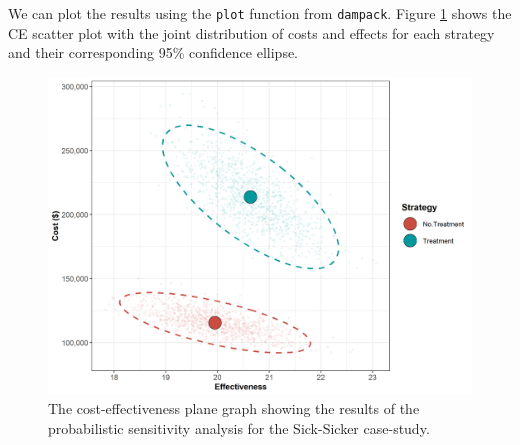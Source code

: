 \documentclass[]{book}
\newenvironment{Shaded}{\begin{snugshade}}{\end{snugshade}}
\newcommand{\KeywordTok}[1]{\textcolor[rgb]{0.13,0.29,0.53}{\textbf{#1}}}
\newcommand{\DataTypeTok}[1]{\textcolor[rgb]{0.13,0.29,0.53}{#1}}
\newcommand{\DecValTok}[1]{\textcolor[rgb]{0.00,0.00,0.81}{#1}}
\newcommand{\CharTok}[1]{\textcolor[rgb]{0.31,0.60,0.02}{#1}}
\newcommand{\StringTok}[1]{\textcolor[rgb]{0.31,0.60,0.02}{#1}}
\newcommand{\CommentTok}[1]{\textcolor[rgb]{0.56,0.35,0.01}{\textit{#1}}}
\newcommand{\ControlFlowTok}[1]{\textcolor[rgb]{0.13,0.29,0.53}{\textbf{#1}}}
\newcommand{\OperatorTok}[1]{\textcolor[rgb]{0.81,0.36,0.00}{\textbf{#1}}}
\newcommand{\NormalTok}[1]{#1}
\begin{document}
\begin{Shaded}
\end{Shaded}

We can plot the results using the \texttt{plot} function from
\texttt{dampack}. Figure \ref{fig:05a-CEAplane} shows the CE scatter
plot with the joint distribution of costs and effects for each strategy
and their corresponding 95\% confidence ellipse.

\begin{figure}

{\centering \includegraphics[width=1\linewidth]{../figs/05a_cea_plane_scatter} 

}

\caption{The cost-effectiveness plane graph showing the results of the probabilistic sensitivity analysis for the Sick-Sicker case-study.}\label{fig:05a-CEAplane}
\end{figure}
\end{document}

